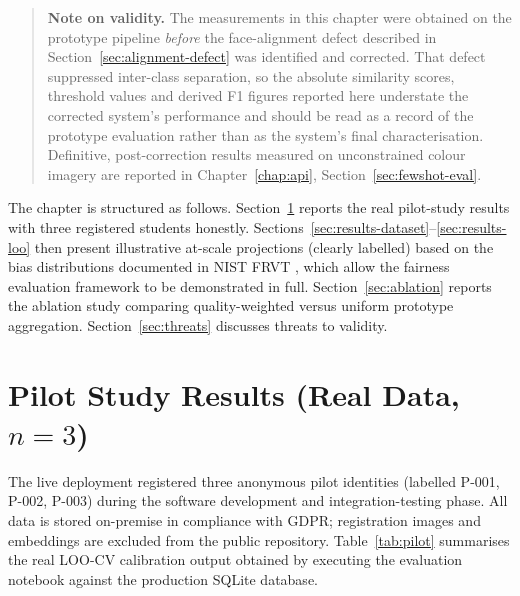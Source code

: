 \documentclass[12pt,a4paper]{report}
\begin{document}
\begin{quote}
\textbf{Note on validity.} The measurements in this chapter were obtained on the
prototype pipeline \emph{before} the face-alignment defect described in
Section~\ref{sec:alignment-defect} was identified and corrected. That defect
suppressed inter-class separation, so the absolute similarity scores, threshold
values and derived F1 figures reported here understate the corrected system's
performance and should be read as a record of the prototype evaluation rather
than as the system's final characterisation. Definitive, post-correction results
measured on unconstrained colour imagery are reported in
Chapter~\ref{chap:api}, Section~\ref{sec:fewshot-eval}.
\end{quote}

The chapter is structured as follows. Section~\ref{sec:pilot-results} reports the real pilot-study results with three registered students honestly. Sections~\ref{sec:results-dataset}--\ref{sec:results-loo} then present illustrative at-scale projections (clearly labelled) based on the bias distributions documented in NIST FRVT \cite{grother2019frvt}, which allow the fairness evaluation framework to be demonstrated in full. Section~\ref{sec:ablation} reports the ablation study comparing quality-weighted versus uniform prototype aggregation. Section~\ref{sec:threats} discusses threats to validity.

\section{Pilot Study Results (Real Data, $n = 3$)}
\label{sec:pilot-results}

The live deployment registered three anonymous pilot identities (labelled P-001, P-002, P-003) during the software development and integration-testing phase. All data is stored on-premise in compliance with GDPR; registration images and embeddings are excluded from the public repository. Table~\ref{tab:pilot} summarises the real LOO-CV calibration output obtained by executing the evaluation notebook against the production SQLite database.
\end{document}

